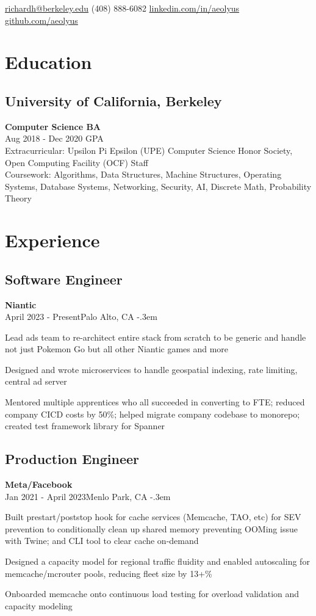 \documentclass{article}
\makeatletter
\def\faEmail{{\FAFR \symbol{"F0E0}}} %
\def\faPhone{{\FAFR \symbol{"F095}}} %
\def\faLinkedin{{\FAB \symbol{"F08C}}} %
\def\faGithub{{\FAB \symbol{"F09B}}} %
\let\olditemize=\itemize \let\endolditemize=\enditemize
\renewenvironment{itemize}{\olditemize[topsep=0em] \itemsep-.3em}{\endolditemize}
\newcommand{\link}[1]{\href{https://#1}{#1}}
\newcommand{\entry}[3]{\quad\textbf{#1}\\#2\qquad#3}
\renewcommand{\maketitle}{
  \begin{flushleft}
    \Huge\bfseries\theauthor
  \end{flushleft}
  \begin{bfseries}
    \faEmail    \hspace{1pt} \href{mailto:richardh@berkeley.edu}{richardh@berkeley.edu} \quad
    \faPhone    \hspace{1pt} (408) 888-6082 \quad
    \faLinkedin \hspace{1pt} \link{linkedin.com/in/aeolyus} \quad
    \faGithub   \hspace{1pt} \link{github.com/aeolyus}
  \end{bfseries}
}
\makeatother
\begin{document}
\author{\color{accentcolor}Richard Huang}
\maketitle


\section{Education}
\subsection{University of California, Berkeley}
\entry{Computer Science BA}{Aug 2018 - Dec 2020}{3.84 GPA}\\
Extracurricular:
  Upsilon Pi Epsilon (UPE) Computer Science Honor Society,
  Open Computing Facility (OCF) Staff\\
Coursework:
  Algorithms,
  Data Structures,
  Machine Structures,
  Operating Systems,
  Database Systems,
  Networking,
  Security,
  AI, Discrete Math,
  Probability Theory


\section{Experience}

\subsection{Software Engineer}
\entry{Niantic}{April 2023 - Present}{Palo Alto, CA}
\begin{itemize}
  \item Lead ads team to re-architect entire stack from scratch to be generic
    and handle not just Pokemon Go but all other Niantic games and more
  \item Designed and wrote microservices to handle geospatial indexing, rate
    limiting, central ad server
  \item Mentored multiple apprentices who all succeeded in converting to FTE;
    reduced company CICD costs by 50\%; helped migrate company codebase to
    monorepo; created test framework library for Spanner
\end{itemize}

\subsection{Production Engineer}
\entry{Meta/Facebook}{Jan 2021 - April 2023}{Menlo Park, CA}
\begin{itemize}
  \item Built prestart/poststop hook for cache services (Memcache, TAO, etc)
    for SEV prevention to conditionally clean up shared memory preventing
    OOMing issue with Twine; and CLI tool to clear cache on-demand
  \item Designed a capacity model for regional traffic fluidity and enabled
    autoscaling for memcache/mcrouter pools, reducing fleet size by 13+\%
  \item Onboarded memcache onto continuous load testing for overload validation
    and capacity modeling
\end{itemize}
\end{document}
